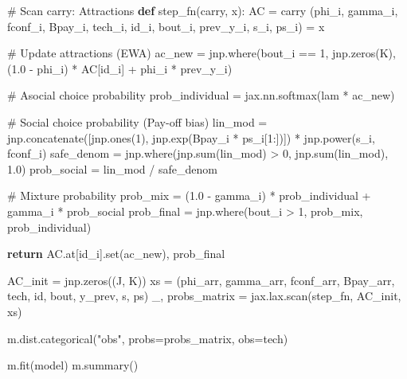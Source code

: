 \documentclass[
  letterpaper,
  DIV=11,
  numbers=noendperiod]{scrartcl}
\newenvironment{Shaded}{\begin{snugshade}}{\end{snugshade}}
\newcommand{\BuiltInTok}[1]{\textcolor[rgb]{0.00,0.23,0.31}{#1}}
\newcommand{\CommentTok}[1]{\textcolor[rgb]{0.37,0.37,0.37}{#1}}
\newcommand{\ControlFlowTok}[1]{\textcolor[rgb]{0.00,0.23,0.31}{\textbf{#1}}}
\newcommand{\DecValTok}[1]{\textcolor[rgb]{0.68,0.00,0.00}{#1}}
\newcommand{\FloatTok}[1]{\textcolor[rgb]{0.68,0.00,0.00}{#1}}
\newcommand{\KeywordTok}[1]{\textcolor[rgb]{0.00,0.23,0.31}{\textbf{#1}}}
\newcommand{\NormalTok}[1]{\textcolor[rgb]{0.00,0.23,0.31}{#1}}
\newcommand{\OperatorTok}[1]{\textcolor[rgb]{0.37,0.37,0.37}{#1}}
\newcommand{\StringTok}[1]{\textcolor[rgb]{0.13,0.47,0.30}{#1}}
\begin{document}
\begin{Shaded}
\begin{Highlighting}[]
    \CommentTok{\# Scan carry: Attractions}
    \KeywordTok{def}\NormalTok{ step\_fn(carry, x):}
\NormalTok{        AC }\OperatorTok{=}\NormalTok{ carry}
\NormalTok{        (phi\_i, gamma\_i, fconf\_i, Bpay\_i, tech\_i, id\_i, bout\_i, prev\_y\_i, s\_i, ps\_i) }\OperatorTok{=}\NormalTok{ x}

        \CommentTok{\# Update attractions (EWA)}
\NormalTok{        ac\_new }\OperatorTok{=}\NormalTok{ jnp.where(bout\_i }\OperatorTok{==} \DecValTok{1}\NormalTok{, jnp.zeros(K), (}\FloatTok{1.0} \OperatorTok{{-}}\NormalTok{ phi\_i) }\OperatorTok{*}\NormalTok{ AC[id\_i] }\OperatorTok{+}\NormalTok{ phi\_i }\OperatorTok{*}\NormalTok{ prev\_y\_i)}
        
        \CommentTok{\# Asocial choice probability}
\NormalTok{        prob\_individual }\OperatorTok{=}\NormalTok{ jax.nn.softmax(lam }\OperatorTok{*}\NormalTok{ ac\_new)}

        \CommentTok{\# Social choice probability (Pay{-}off bias)}
\NormalTok{        lin\_mod }\OperatorTok{=}\NormalTok{ jnp.concatenate([jnp.ones(}\DecValTok{1}\NormalTok{), jnp.exp(Bpay\_i }\OperatorTok{*}\NormalTok{ ps\_i[}\DecValTok{1}\NormalTok{:])]) }\OperatorTok{*}\NormalTok{ jnp.power(s\_i, fconf\_i)}
\NormalTok{        safe\_denom }\OperatorTok{=}\NormalTok{ jnp.where(jnp.}\BuiltInTok{sum}\NormalTok{(lin\_mod) }\OperatorTok{\textgreater{}} \DecValTok{0}\NormalTok{, jnp.}\BuiltInTok{sum}\NormalTok{(lin\_mod), }\FloatTok{1.0}\NormalTok{)}
\NormalTok{        prob\_social }\OperatorTok{=}\NormalTok{ lin\_mod }\OperatorTok{/}\NormalTok{ safe\_denom}

        \CommentTok{\# Mixture probability}
\NormalTok{        prob\_mix }\OperatorTok{=}\NormalTok{ (}\FloatTok{1.0} \OperatorTok{{-}}\NormalTok{ gamma\_i) }\OperatorTok{*}\NormalTok{ prob\_individual }\OperatorTok{+}\NormalTok{ gamma\_i }\OperatorTok{*}\NormalTok{ prob\_social}
\NormalTok{        prob\_final }\OperatorTok{=}\NormalTok{ jnp.where(bout\_i }\OperatorTok{\textgreater{}} \DecValTok{1}\NormalTok{, prob\_mix, prob\_individual)}

        \ControlFlowTok{return}\NormalTok{ AC.at[id\_i].}\BuiltInTok{set}\NormalTok{(ac\_new), prob\_final}

\NormalTok{    AC\_init }\OperatorTok{=}\NormalTok{ jnp.zeros((J, K))}
\NormalTok{    xs }\OperatorTok{=}\NormalTok{ (phi\_arr, gamma\_arr, fconf\_arr, Bpay\_arr, tech, }\BuiltInTok{id}\NormalTok{, bout, y\_prev, s, ps)}
\NormalTok{    \_, probs\_matrix }\OperatorTok{=}\NormalTok{ jax.lax.scan(step\_fn, AC\_init, xs)}
    
\NormalTok{    m.dist.categorical(}\StringTok{"obs"}\NormalTok{, probs}\OperatorTok{=}\NormalTok{probs\_matrix, obs}\OperatorTok{=}\NormalTok{tech)}

\NormalTok{m.fit(model)}
\NormalTok{m.summary()}
\end{Highlighting}
\end{Shaded}
\end{document}
